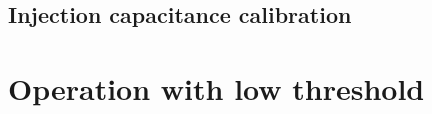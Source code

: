 

\begin{comment}

The ultimate purpose of this measurement is to describe (characterize) the response of each pixel by injecting a charge equivalent to the typical energy released from particles emitted in decays of radioactive materials. As explained in the previous section (reference), for example the \ch{^{55}Fe} has an emission spectrum with quite sharp lines and this allows to compare data more easily. The first line is at 5.9 KeV which corresponds on average to about 1616 $e^{-}$ released (through the pixel??).

\begin{figure}[h!]
\centering
\texttt{[image: spectrum\_fe]}
\caption{\ch{^{55}Fe} (radioactive source) emission spectrum using the analog output of a PMOS reset front-end of TJ-Monopix 1. (reference)}
\label{fig:fespectrum}
\end{figure}

\end{comment}

\subsection{Injection capacitance calibration}



\section{Operation with low threshold}


